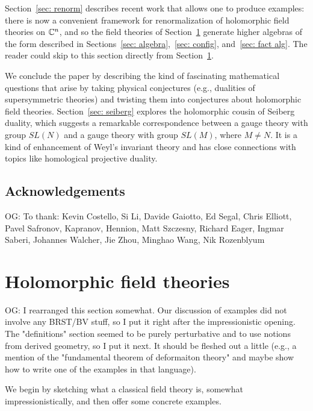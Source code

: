 \documentclass[11pt]{amsart}
\def\owen#1{{\textcolor{violet!50!black}{OG: {#1}}}}
\begin{document}
Section~\ref{sec: renorm} describes recent work that allows one to produce examples:
there is now a convenient framework for renormalization of holomorphic field theories on $\mathbb C^n$,
and so the field theories of Section~\ref{sec: HFT} generate higher algebras of the form described in Sections~\ref{sec: algebra},~\ref{sec: config}, and~\ref{sec: fact alg}.
The reader could skip to this section directly from Section~\ref{sec: HFT}.

We conclude the paper by describing the kind of fascinating mathematical questions
that arise by taking physical conjectures (e.g., dualities of supersymmetric theories) and twisting them into conjectures about holomorphic field theories. 
Section~\ref{sec: seiberg} explores the holomorphic cousin of Seiberg duality,
which suggests a remarkable correspondence between a gauge theory with group $SL(N)$ and a gauge theory with group $SL(M)$, where $M \neq N$.
It is a kind of enhancement of Weyl's invariant theory and has close connections with topics like homological projective duality.


\subsection{Acknowledgements}

\owen{To thank: Kevin Costello, Si Li, Davide Gaiotto, Ed Segal, Chris Elliott, Pavel Safronov, Kapranov, Hennion, Matt Szczesny, Richard Eager, Ingmar Saberi, Johannes Walcher, Jie Zhou, Minghao Wang, Nik Rozenblyum}

\section{Holomorphic field theories}
\label{sec: HFT}

\owen{I rearranged this section somewhat. Our discussion of examples did not involve any BRST/BV stuff, so I put it right after the impressionistic opening. The "definitions" section seemed to be purely perturbative and to use notions from derived geometry, so I put it next. It should be fleshed out a little (e.g., a mention of the "fundamental theorem of deformaiton theory" and maybe show how to write one of the examples in that language).}

We begin by sketching what a classical field theory is, somewhat impressionistically, and then offer some concrete examples.
\end{document}
